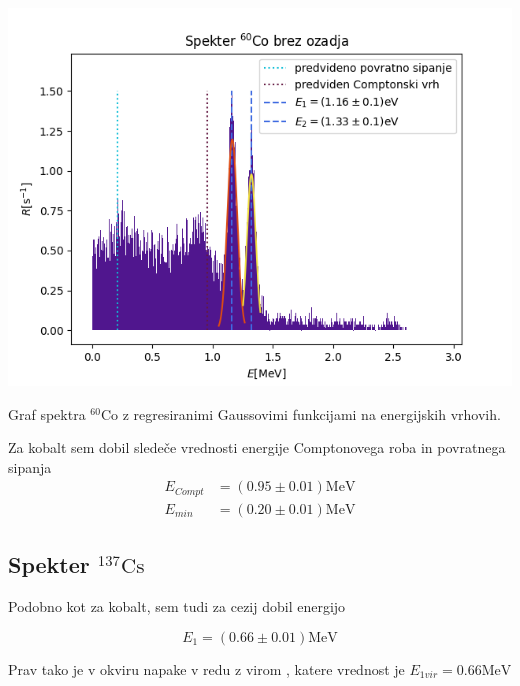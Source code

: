 \documentclass[11pt]{article}
\begin{document}
\begin{slika}[H]
\begin{center}
\includegraphics[width=.9\linewidth]{figures/Co60_no_bg.png}
\caption{\small Graf spektra $^{60} \mathrm{Co}$ z regresiranimi Gaussovimi funkcijami na energijskih vrhovih. }
\end{center}
\end{slika}

Za kobalt sem dobil sledeče vrednosti energije Comptonovega roba in povratnega sipanja
\begin{align*}
  E_{Compt} &= (0.95 \pm 0.01) \mathrm{MeV} \\
E_{min} &= (0.20 \pm 0.01) \mathrm{MeV}
\end{align*}
\subsection{Spekter \(^{137} \mathrm{Cs}\)}\label{sec:org8835c43}

Podobno kot za kobalt, sem tudi za cezij dobil energijo

\[ E_1 = (0.66 \pm 0.01) \mathrm{MeV}
\]

Prav tako je v okviru napake v redu z virom \autocite{noauthor_rich_2020}, katere vrednost je \(E_{1vir} = 0.66 \mathrm{MeV}\)
\end{document}
